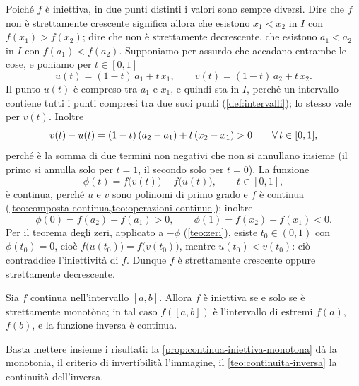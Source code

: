 \begin{dimostrazione}
Poiché $f$ è iniettiva, in due punti distinti i valori sono sempre diversi. Dire che $f$
non è strettamente crescente significa allora che esistono $x_{1}<x_{2}$ in $I$ con
$f(x_{1})>f(x_{2})$; dire che non è strettamente decrescente, che esistono $a_{1}<a_{2}$
in $I$ con $f(a_{1})<f(a_{2})$. Supponiamo per assurdo che accadano entrambe le cose, e
poniamo per $t\in[0,1]$
\begin{equation}\label{eq:iniettiva-uv}
  u(t)=(1-t)\,a_{1}+t\,x_{1}, \qquad v(t)=(1-t)\,a_{2}+t\,x_{2} .
\end{equation}
Il punto $u(t)$ è compreso tra $a_{1}$ e $x_{1}$, e quindi sta in $I$, perché un
intervallo contiene tutti i punti compresi tra due suoi punti (\cref{def:intervalli});
lo stesso vale per $v(t)$. Inoltre
\[
  v(t)-u(t)=(1-t)\,(a_{2}-a_{1})+t\,(x_{2}-x_{1})>0 \qquad\forall\, t\in[0,1],
\]
perché è la somma di due termini non negativi che non si annullano insieme (il primo si
annulla solo per $t=1$, il secondo solo per $t=0$). La funzione
\[
  \phi(t)=f\bigl(v(t)\bigr)-f\bigl(u(t)\bigr), \qquad t\in[0,1],
\]
è continua, perché $u$ e $v$ sono polinomi di primo grado e $f$ è continua
(\cref{teo:composta-continua,teo:operazioni-continue}); inoltre
\[
  \phi(0)=f(a_{2})-f(a_{1})>0, \qquad \phi(1)=f(x_{2})-f(x_{1})<0 .
\]
Per il teorema degli zeri, applicato a $-\phi$ (\cref{teo:zeri}), esiste $t_{0}\in(0,1)$
con $\phi(t_{0})=0$, cioè $f\bigl(u(t_{0})\bigr)=f\bigl(v(t_{0})\bigr)$, mentre
$u(t_{0})<v(t_{0})$: ciò contraddice l'iniettività di $f$. Dunque $f$ è strettamente
crescente oppure strettamente decrescente.
\end{dimostrazione}

\begin{corollario}\label{cor:continua-invertibile}
Sia $f$ continua nell'intervallo $[a,b]$. Allora $f$ è iniettiva se e solo se è
strettamente monotòna; in tal caso $f([a,b])$ è l'intervallo di estremi $f(a)$, $f(b)$,
e la funzione inversa è continua.
\end{corollario}

\begin{schema}
\end{schema}

\begin{strategia}
Basta mettere insieme i risultati: la \cref{prop:continua-iniettiva-monotona} dà la
monotonia, il criterio di invertibilità l'immagine, il \cref{teo:continuita-inversa} la
continuità dell'inversa.
\end{strategia}

